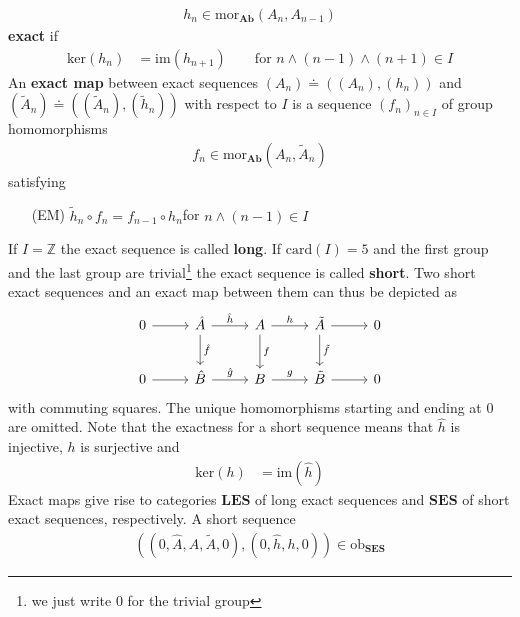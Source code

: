 \begin{align*}
  h_{n}
  \in
  \mathrm{mor}_{\mathbf{Ab}}(A_{n},A_{n-1})
\end{align*}
\textbf{exact} if
\begin{align*}
  \mathrm{ker}(h_{n})
  &=
  \mathrm{im}(h_{n+1})
  \qquad
  \text{for }
  n
  \land
  (n-1)
  \land
  (n+1)
  \in
  I
\end{align*}
An \textbf{exact map} between exact sequences $(A_{n}) \doteq ((A_{n}),(h_{n}))$ and $(\tilde{A}_{n}) \doteq ((\tilde{A}_{n}),(\tilde{h}_{n}))$ with respect to $I$ is a sequence $(f_{n})_{n \in I}$ of group homomorphisms
\begin{align*}
  f_{n}
  \in
  \mathrm{mor}_{\mathbf{Ab}}(A_{n},\tilde{A}_{n})
\end{align*}
satisfying
\begin{enumerate}
\item[(EM)]
$\tilde{h}_{n} \circ f_{n} = f_{n-1} \circ h_{n}$\qquad for $n \land (n-1) \in I$
\end{enumerate}
If $I = \mathbb{Z}$ the exact sequence is called \textbf{long}. If $\mathrm{card}(I) = 5$ and the first group and the last group are trivial\footnote{we just write $0$ for the trivial group} the exact sequence is called \textbf{short}. Two short exact sequences and an exact map between them can thus be depicted as
\begin{equation*}
\begin{tikzcd}[row sep=2.2em,column sep=2.6em]
  0
  \ar{r}
  &
  \hat{A}
  \ar{r}{\hat{h}}
  \ar{d}{\hat{f}}
  &
  A
  \ar{r}{h}
  \ar{d}{f}
  &
  \tilde{A}
  \ar{r}
  \ar{d}{\tilde{f}}
  &
  0
  \\
  0
  \ar{r}
  &
  \hat{B}
  \ar{r}{\hat{g}}
  &
  B
  \ar{r}{g}
  &
  \tilde{B}
  \ar{r}
  &
  0
\end{tikzcd}
\end{equation*}
with commuting squares. The unique homomorphisms starting and ending at $0$ are omitted. Note that the exactness for a short sequence means that $\hat{h}$ is injective, $h$ is surjective and
\begin{align*}
  \mathrm{ker}(h)
  &=
  \mathrm{im}(\hat{h})
\end{align*}
Exact maps give rise to categories $\mathbf{LES}$ of long exact sequences and $\mathbf{SES}$ of short exact sequences, respectively. A short sequence
\begin{align*}
  \left(
    \left(
      0
      ,\hat{A}
      ,
      A
      ,
      \tilde{A}
      ,
      0
    \right)
    ,
    (0,\hat{h},h,0)
  \right)
  \in
  \mathrm{ob}_{\mathbf{SES}}
\end{align*}
